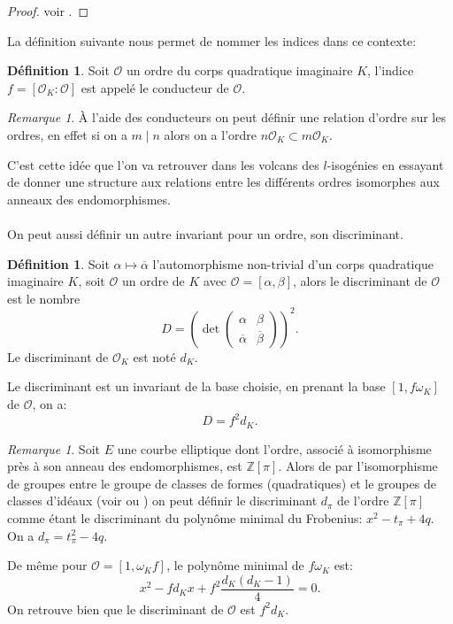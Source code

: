 \documentclass[10pt,a4paper]{book}
\theoremstyle{plain}
\theoremstyle{definition}
\theoremstyle{definition}
\theoremstyle{definition}
\theoremstyle{definition}
\theoremstyle{definition}
\newtheorem{defi}[thm]{Définition}
\theoremstyle{remark}
\newtheorem{rem}[thm]{Remarque}
\theoremstyle{remark}
\theoremstyle{definition}
\begin{document}
\begin{proof}
voir \cite[lemma 7.7.2]{Cox89}.
\end{proof}

La définition suivante nous permet de nommer les indices dans ce contexte:
\begin{defi}
Soit $\mathcal{O}$ un ordre du corps quadratique imaginaire $K$, l'indice $f=[\mathcal{O}_K : \mathcal{O}]$ est appelé le conducteur de $\mathcal{O}$.
\end{defi}

\begin{rem}
\`A l'aide des conducteurs on peut définir une relation d'ordre sur les ordres, en effet si on a $m \mid n$ alors on a l'ordre $n\mathcal{O}_K \subset m\mathcal{O}_K$.
\end{rem}

C'est cette idée que l'on va retrouver dans les volcans des $l$-isogénies en essayant de donner une structure aux relations entre les différents ordres isomorphes aux anneaux des endomorphismes.
\\
\\
On peut aussi définir un autre invariant pour un ordre, son discriminant.

\begin{defi}
Soit $\alpha \mapsto \overline{\alpha}$ l'automorphisme non-trivial d'un corps quadratique imaginaire $K$, soit $\mathcal{O}$ un ordre de $K$ avec $\mathcal{O}=[\alpha, \beta]$, alors le discriminant de $\mathcal{O}$ est le nombre 
\[D= \left( \det \left( 
\begin{array}{cc}
\alpha & \beta\\
\overline{\alpha} & \overline{\beta}
\end{array} 
\right) \right)^2. \]
Le discriminant de $\mathcal{O}_K$ est noté $d_K$.
\end{defi}
Le discriminant est un invariant de la base choisie, en prenant la base $[1, f 
\omega_K]$ de $\mathcal{O}$, on a:
\[D=f^2d_K.\]


\begin{rem}
\label{rem:def:dpi}
Soit $E$ une courbe elliptique dont l'ordre, associé à isomorphisme près à son 
anneau des endomorphismes, est $\mathbb{Z}[\pi]$. Alors de par l'isomorphisme 
de groupes entre le groupe de classes de formes (quadratiques) et le groupes de
classes d'idéaux (voir \cite[Theorem 7.7]{Cox89} ou \cite[Theorem 5.2.8]{Cohen96}) on 
peut définir le discriminant $d_{\pi}$ de l'ordre $\mathbb{Z}[\pi]$ comme étant
le discriminant du polynôme minimal du Frobenius: $x^2-t_{\pi}+4q$. On a 
$d_{\pi} =t_{\pi}^2-4q$.

De même pour $\mathcal{O}=[ 1, \omega_K f ]$, le polynôme 
minimal de $f \omega_K$ est:
\[
x^2-fd_Kx+f^2\frac{d_K (d_K-1)}{4}=0.
\]
On retrouve bien que le discriminant de $\mathcal{O}$ est $f^2d_K$.
\end{rem}
\end{document}
